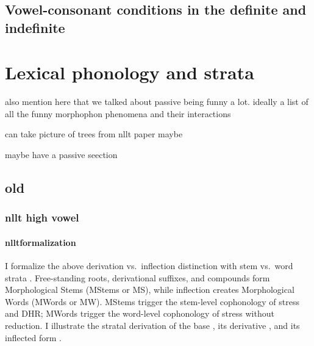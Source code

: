 \section{Vowel-consonant conditions in the definite and indefinite}



\chapter{Lexical phonology and strata}

also mention here that we talked about passive being funny a lot. ideally a list of all the funny morphophon phenomena and their interactions

can take picture of trees from nllt paper maybe

maybe have a passive seection
\section{old}

\subsection{nllt high vowel}
\subsubsection{nlltformalization}
I formalize the above derivation vs.\ inflection distinction with stem vs.\ word strata \citep{Kiparsky-1982-lexicalMorphoPhono,Kiparsky-2000-OpacityCyclicity,Kiparsky-2015-StratalOT,Bermudez-2011-Cyclicity,Bermudez-2012-ArchitectureDivisionLaborExponence,BermudezOtero-2018-StratalPhonology}. Free-standing roots, derivational suffixes, and compounds form Morphological Stems (MStems or MS), while inflection creates Morphological Words (MWords or MW). MStems trigger the stem-level cophonology of stress and DHR; MWords trigger the word-level cophonology of stress without reduction. I illustrate the stratal derivation of the base \textit{}, its derivative \textit{}, and its inflected form \textit{}. 


